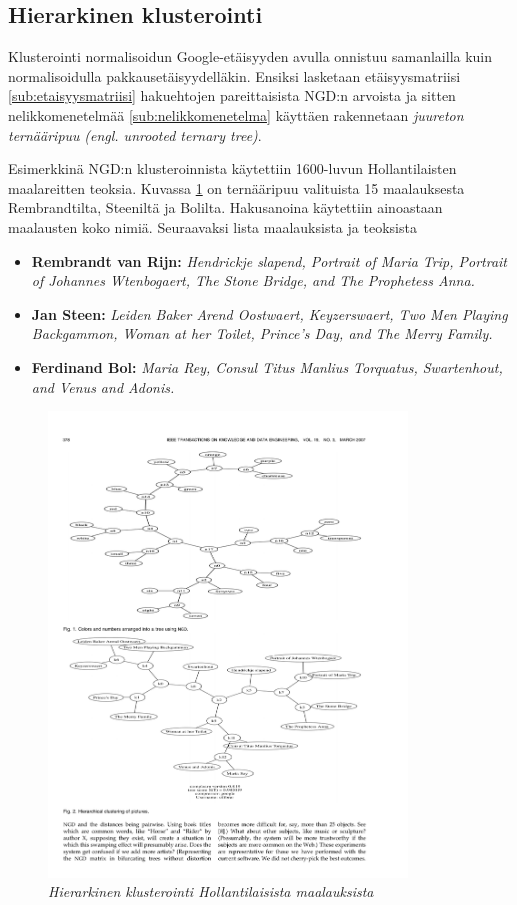 \documentclass[12pt,finnish]{tktltiki2}
\theoremstyle{definition}
\theoremstyle{remark}
\newcommand{\engl}[1]{\emph{(engl. #1)}}
\begin{document}
    \subsection{Hierarkinen klusterointi} %
    \label{sub:klusterointi}
      Klusterointi normalisoidun Google-etäisyyden avulla onnistuu samanlailla kuin normalisoidulla pakkausetäisyydelläkin. Ensiksi lasketaan etäisyysmatriisi \ref{sub:etaisyysmatriisi} hakuehtojen pareittaisista NGD:n arvoista ja sitten nelikkomenetelmää \ref{sub:nelikkomenetelma} käyttäen rakennetaan \emph{juureton ternääripuu} \engl{unrooted ternary tree}.

      Esimerkkinä NGD:n klusteroinnista käytettiin 1600-luvun Hollantilaisten maalareitten teoksia. Kuvassa \ref{fig:dutch-paintings} on ternääripuu valituista 15 maalauksesta Rembrandtilta, Steeniltä ja Bolilta. Hakusanoina käytettiin ainoastaan maalausten koko nimiä. Seuraavaksi lista maalauksista ja teoksista

      \begin{itemize}
        \item \textbf{Rembrandt van Rijn:} \emph{Hendrickje slapend, Portrait of Maria Trip, Portrait of Johannes Wtenbogaert, The Stone Bridge, and The Prophetess Anna.}
        \item \textbf{Jan Steen:} \emph{Leiden Baker Arend Oostwaert, Keyzerswaert, Two Men Playing Backgammon, Woman at her Toilet, Prince’s Day, and The Merry Family.}
        \item \textbf{Ferdinand Bol:} \emph{Maria Rey, Consul Titus Manlius Torquatus, Swartenhout, and Venus and Adonis.}
      \end{itemize}

      \begin{figure}[!htb]
        \immediate{}
        \includegraphics[width=\textwidth, height=350pt]{img/dutch-paintings}
        \caption{\emph{Hierarkinen klusterointi Hollantilaisista maalauksista} \cite{cilibrasi2007google} }
        \label{fig:dutch-paintings}
      \end{figure}
\end{document}
